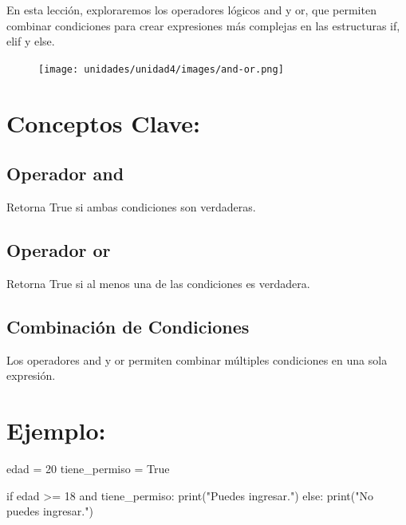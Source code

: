 \documentclass[
  a4paper,
  DIV=11,
  numbers=noendperiod,
  onepage,
  openany]{scrreprt}
\newenvironment{Shaded}{\begin{snugshade}}{\end{snugshade}}
\newcommand{\BuiltInTok}[1]{\textcolor[rgb]{0.00,0.23,0.31}{#1}}
\newcommand{\ControlFlowTok}[1]{\textcolor[rgb]{0.00,0.23,0.31}{#1}}
\newcommand{\DecValTok}[1]{\textcolor[rgb]{0.68,0.00,0.00}{#1}}
\newcommand{\KeywordTok}[1]{\textcolor[rgb]{0.00,0.23,0.31}{#1}}
\newcommand{\NormalTok}[1]{\textcolor[rgb]{0.00,0.23,0.31}{#1}}
\newcommand{\OperatorTok}[1]{\textcolor[rgb]{0.37,0.37,0.37}{#1}}
\newcommand{\StringTok}[1]{\textcolor[rgb]{0.13,0.47,0.30}{#1}}
\newcommand{\VariableTok}[1]{\textcolor[rgb]{0.07,0.07,0.07}{#1}}
\begin{document}
En esta lección, exploraremos los operadores lógicos and y or, que
permiten combinar condiciones para crear expresiones más complejas en
las estructuras if, elif y else.

\begin{figure}

{\centering \texttt{[image: unidades/unidad4/images/and-or.png]}

}

\end{figure}

\section{Conceptos Clave:}\label{conceptos-clave-15}

\subsection{Operador and}\label{operador-and}

Retorna True si ambas condiciones son verdaderas.

\subsection{Operador or}\label{operador-or}

Retorna True si al menos una de las condiciones es verdadera.

\subsection{Combinación de
Condiciones}\label{combinaciuxf3n-de-condiciones}

Los operadores and y or permiten combinar múltiples condiciones en una
sola expresión.

\section{Ejemplo:}\label{ejemplo-10}

\begin{Shaded}
\begin{Highlighting}[]
\NormalTok{edad }\OperatorTok{=} \DecValTok{20}
\NormalTok{tiene\_permiso }\OperatorTok{=} \VariableTok{True}

\ControlFlowTok{if}\NormalTok{ edad }\OperatorTok{\textgreater{}=} \DecValTok{18} \KeywordTok{and}\NormalTok{ tiene\_permiso:}
    \BuiltInTok{print}\NormalTok{(}\StringTok{"Puedes ingresar."}\NormalTok{)}
\ControlFlowTok{else}\NormalTok{:}
    \BuiltInTok{print}\NormalTok{(}\StringTok{"No puedes ingresar."}\NormalTok{)}
\end{Highlighting}
\end{Shaded}
\end{document}
